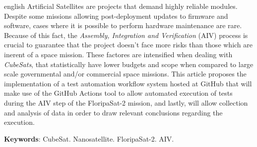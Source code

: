 \begin{resumo}[Abstract]
	\SingleSpacing
	\begin{otherlanguage*}{english}
	    Artificial Satellites are projects that demand highly reliable modules. Despite some missions allowing post-deployment updates to firmware and software, cases where it is possible to perform hardware maintenance are rare. Because of this fact, the \textit{Assembly, Integration and Verification} (AIV) process is crucial to guarantee that the project doesn't face more risks than those which are inerent of a space mission. These factores are intensified when dealing with \textit{CubeSats}, that statistically have lower budgets and scope when compared to large scale governmental and/or commercial space missions. This article proposes the implementation of a test automation workflow system hosted at GitHub that will make use of the GitHub Actions tool to allow automated execution of tests during the AIV step of the FloripaSat-2 mission, and lastly, will allow collection and analysis of data in order to draw relevant conclusions regarding the execution.
	
	
		\textbf{Keywords}: CubeSat. Nanosatellite. FloripaSat-2. AIV.
	\end{otherlanguage*}
\end{resumo}
% 
%
%  

{%
	\hypersetup{hidelinks}
	\listoffigures*
	\cleardoublepage
	
	\listofquadros*
	\cleardoublepage
	
	\listoftables*
	\cleardoublepage
	
	
	
	
% 	
	
	\tableofcontents*
	\cleardoublepage
	
}%
